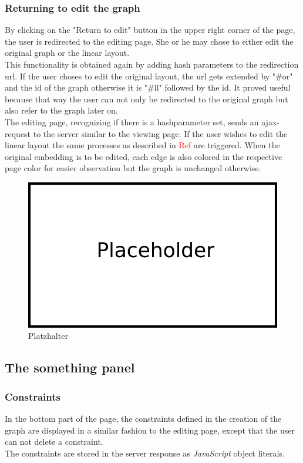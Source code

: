 \subsubsection{Returning to edit the graph}
By clicking on the "Return to edit" button in the upper right corner of the page, the user is redirected to the editing page. She or he may chose to either edit the original graph or the linear layout.\\
This functionality is obtained again by adding hash parameters to the redirection url. If the user choses to edit the original layout, the url gets extended by "\#or" and the id of the graph otherwise it is "\#ll" followed by the id. It proved useful because that way the user can not only be redirected to the original graph but also refer to the graph later on.\\
The editing page, recognizing if there is a hashparameter set, sends an ajax-request to the server similar to the viewing page. If the user wishes to edit the linear layout the same processes as described in \textcolor{red}{Ref} are triggered. When the original embedding is to be edited, each edge is also colored in the respective page color for easier observation but the graph is unchanged otherwise.\\
\begin{figure}[!h]
\begin{center}
\includegraphics[width=1\textwidth]{figures/Platzhalter.png}
\caption{Platzhalter}
\label{img:plzhltr}
\end{center}
\end{figure}
\subsection{The something panel}
\subsubsection{Constraints}
In the bottom part of the page, the constraints defined in the creation of the graph are displayed in a similar fashion to the editing page, except that the user can not delete a constraint. \\
The constraints are stored in the server response as \textit{JavaScript} object literals. 

